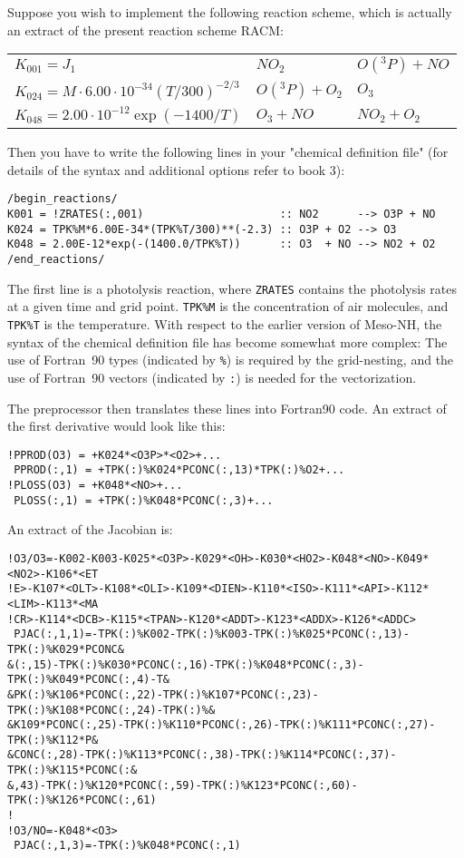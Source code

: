 Suppose you wish to implement the following reaction scheme, which is
actually an extract of the present reaction scheme RACM:

{\small
\begin{tabular}{l@{\,\,:\,\,}l@{\protect$\quad\longrightarrow\quad\protect$}l}
$K_{001} = J_1$ & $NO_{2}$ & $O({}^3P)+NO$ \\
$K_{024} = M \cdot 6.00\cdot10^{-34} \left( T / 300 \right)^{-2/3} $ 
         & $O({}^3P)+O_{2}$ & $O_{3}$ \\
$K_{048} = 2.00\cdot10^{-12} \exp\left( -1400/T \right)$ 
         & $O_{3}+NO$ & $NO_{2}+O_{2}$ 
\end{tabular}
}

Then you have to write the following lines in your
"chemical definition file" (for details of the syntax and additional 
options refer to book 3):

{\small
\begin{verbatim}
/begin_reactions/
K001 = !ZRATES(:,001)                     :: NO2      --> O3P + NO
K024 = TPK%M*6.00E-34*(TPK%T/300)**(-2.3) :: O3P + O2 --> O3
K048 = 2.00E-12*exp(-(1400.0/TPK%T))      :: O3  + NO --> NO2 + O2
/end_reactions/
\end{verbatim}
}
The first line is a photolysis reaction, where {\tt ZRATES} contains
the photolysis rates at a given time and grid point.
{\tt TPK\%M} is the concentration of air molecules, and {\tt TPK\%T} is
the temperature.  With respect to the earlier version of Meso-NH,
the syntax of the chemical definition file has become somewhat more
complex: The use of Fortran~90 types (indicated by {\tt \%}) is
required by the grid-nesting, and the use of Fortran~90 vectors
(indicated by {\tt :}) is needed for the vectorization.

The preprocessor then translates these lines into Fortran90 code.
An extract of  the first derivative would look like this:
{\small
\begin{verbatim}
!PPROD(O3) = +K024*<O3P>*<O2>+...
 PPROD(:,1) = +TPK(:)%K024*PCONC(:,13)*TPK(:)%O2+...
!PLOSS(O3) = +K048*<NO>+...
 PLOSS(:,1) = +TPK(:)%K048*PCONC(:,3)+...
\end{verbatim}
}

An extract of the Jacobian is:
{\small
\begin{verbatim}
!O3/O3=-K002-K003-K025*<O3P>-K029*<OH>-K030*<HO2>-K048*<NO>-K049*<NO2>-K106*<ET
!E>-K107*<OLT>-K108*<OLI>-K109*<DIEN>-K110*<ISO>-K111*<API>-K112*<LIM>-K113*<MA
!CR>-K114*<DCB>-K115*<TPAN>-K120*<ADDT>-K123*<ADDX>-K126*<ADDC>
 PJAC(:,1,1)=-TPK(:)%K002-TPK(:)%K003-TPK(:)%K025*PCONC(:,13)-TPK(:)%K029*PCONC&
&(:,15)-TPK(:)%K030*PCONC(:,16)-TPK(:)%K048*PCONC(:,3)-TPK(:)%K049*PCONC(:,4)-T&
&PK(:)%K106*PCONC(:,22)-TPK(:)%K107*PCONC(:,23)-TPK(:)%K108*PCONC(:,24)-TPK(:)%&
&K109*PCONC(:,25)-TPK(:)%K110*PCONC(:,26)-TPK(:)%K111*PCONC(:,27)-TPK(:)%K112*P&
&CONC(:,28)-TPK(:)%K113*PCONC(:,38)-TPK(:)%K114*PCONC(:,37)-TPK(:)%K115*PCONC(:&
&,43)-TPK(:)%K120*PCONC(:,59)-TPK(:)%K123*PCONC(:,60)-TPK(:)%K126*PCONC(:,61)
!
!O3/NO=-K048*<O3>
 PJAC(:,1,3)=-TPK(:)%K048*PCONC(:,1)
\end{verbatim}
}

